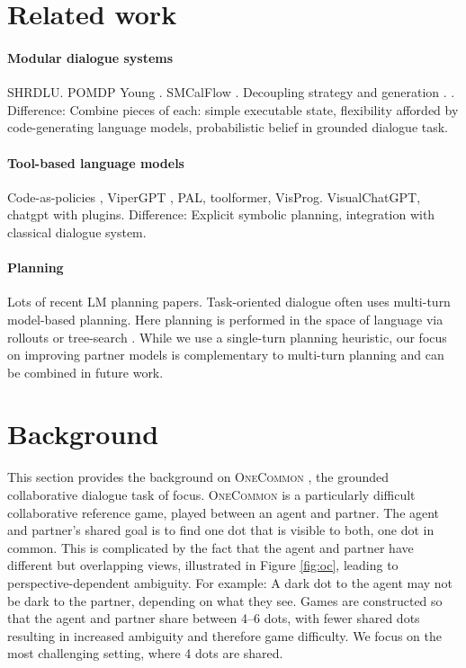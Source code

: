 \documentclass[11pt]{article}
\begin{document}
\section{Related work}

\paragraph{Modular dialogue systems}
SHRDLU. POMDP Young \citep{young2006pomdp}. SMCalFlow \citep{sm}.
Decoupling strategy and generation \citep{he2018dnd}. \citep{fstod}.
Difference: Combine pieces of each: simple executable state,
flexibility afforded by code-generating language models,
probabilistic belief in grounded dialogue task.

\paragraph{Tool-based language models}
Code-as-policies \citep{codeaspolicies2022}, ViperGPT \citep{vipergpt},
PAL, toolformer, VisProg.
VisualChatGPT, chatgpt with plugins.
Difference: Explicit symbolic planning,
integration with classical dialogue system.

\paragraph{Planning}
Lots of recent LM planning papers.
\citep{gandhi2023strategic}
Task-oriented dialogue often uses multi-turn model-based planning.
Here planning is performed in the space of language via rollouts or tree-search
\citep{dnd,yarats2017rollout,ingress,jang2020bapomdp}.
While we use a single-turn planning heuristic,
our focus on improving partner models is complementary to multi-turn planning and can be combined in future work.

\section{Background}
This section provides the background on \textsc{OneCommon} \citep{onecommon},
the grounded collaborative dialogue task of focus.
\textsc{OneCommon} is a particularly difficult collaborative reference game,
played between an agent and partner.
The agent and partner's shared goal is to find one dot that is visible to both,
one dot in common.
This is complicated by the fact that the agent and partner have different but 
overlapping views, illustrated in Figure \ref{fig:oc},
leading to perspective-dependent ambiguity.
For example: A dark dot to the agent may not be dark to the partner, depending on what they see.
Games are constructed so that the agent and partner share between 4--6 dots,
with fewer shared dots resulting in increased ambiguity and therefore game difficulty.
We focus on the most challenging setting, where 4 dots are shared.
\end{document}
